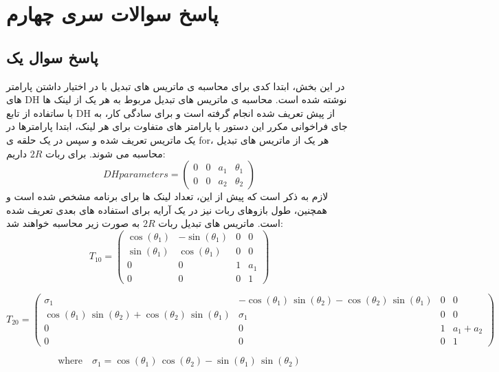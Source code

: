 
\chapter*{پاسخ سوالات سری چهارم}
\section*{پاسخ سوال یک}

در این بخش، ابتدا کدی برای محاسبه ی ماتریس های تبدیل با در اختیار داشتن پارامتر های DH نوشته شده است. محاسبه ی ماتریس های تبدیل مربوط به هر یک از لینک ها با ساتفاده از تابع DH از پیش تعریف شده انجام گرفته است و برای سادگی کار، به جای فراخوانی مکرر این دستور با پارامتر های متفاوت برای هر لینک، ابتدا پارامترها در یک ماتریس تعریف شده و سپس در یک حلقه ی for، هر یک از ماتریس های تبدیل محاسبه می شوند. 
برای ربات $2R$ داریم:
\[
\text{$DH parameters$} = 
\left(\begin{array}{cccc}
	0 & 0 & a_1 & \theta_1 \\
	0 & 0 & a_2 & \theta_2
\end{array}\right)
\]
لازم به ذکر است که پیش از این، تعداد لینک ها برای برنامه مشخص شده است و همچنین، طول بازوهای ربات نیز در یک آرایه برای استفاده های بعدی تعریف شده است. 
ماتریس های تبدیل ربات $2R$ به صورت زیر محاسبه خواهند شد:
\[
T_{10} = 
\left(\begin{array}{cccc} 
	\cos \left(\theta_1 \right) & -\sin \left(\theta_1 \right) & 0 & 0\\
	\sin \left(\theta_1 \right) & \cos \left(\theta_1 \right) & 0 & 0\\
	0 & 0 & 1 & a_1 \\
	0 & 0 & 0 & 1
\end{array}\right)
\]

\[
T_{20} = 
\left(\begin{array}{cccc}
	\sigma_1  & -\cos \left(\theta_1 \right)\,\sin \left(\theta_2 \right)-\cos \left(\theta_2 \right)\,\sin \left(\theta_1 \right) & 0 & 0\\
	\cos \left(\theta_1 \right)\,\sin \left(\theta_2 \right)+\cos \left(\theta_2 \right)\,\sin \left(\theta_1 \right) & \sigma_1  & 0 & 0\\
	0 & 0 & 1 & a_1 +a_2 \\
	0 & 0 & 0 & 1
\end{array}\right)
\]

\[
\text{where} \quad \sigma_1 = \cos \left(\theta_1 \right)\,\cos \left(\theta_2 \right)-\sin \left(\theta_1 \right)\,\sin \left(\theta_2 \right)
\]

